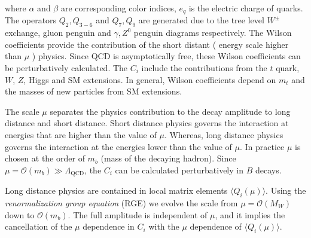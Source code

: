 where $\alpha$ and $\beta$ are corresponding color indices, $e_q$ is the electric charge of quarks. The operators $Q_2, Q_{3-6}$ and $Q_7, Q_9$ are generated due to the tree level $W^{\pm}$ exchange, gluon penguin and $\gamma, Z^0$ penguin diagrams respectively.
The Wilson coefficients provide the contribution of the short distant ( energy scale higher than $\mu$ ) physics.  Since QCD is asymptotically free, these Wilson coefficients can be  perturbatively calculated. The $C_i$ include the contributions from the $t$ quark, $W$, $Z$, Higgs and SM extensions. In general, Wilson coefficients depend on $m_t$ and the masses of new particles from SM extensions.\par
The scale $\mu$ separates the physics contribution to the decay amplitude to long distance and short distance. Short distance physics governs the interaction at energies that are higher than the value of $\mu$. Whereas, long distance physics governs the interaction at the energies lower than the value of $\mu$. In practice $\mu$ is chosen at the order of $m_b$ (mass of the decaying hadron). Since $\mu = \mathcal{O}(m_b)\gg \Lambda_{\text{QCD}}$, the $C_i$ can be calculated perturbatively in $B$ decays.\par
Long distance physics are contained in local matrix elements $\langle Q_i(\mu)\rangle$. Using the \textit{renormalization group equation} (RGE) we evolve the scale from $\mu=\mathcal{O}(M_W)$ down to $\mathcal{O}(m_b)$. The full amplitude is independent of $\mu$, and it implies the cancellation of the $\mu$ dependence in $C_i$ with the $\mu$ dependence of $\langle Q_i(\mu)\rangle$.
\vspace{-0.4cm}
